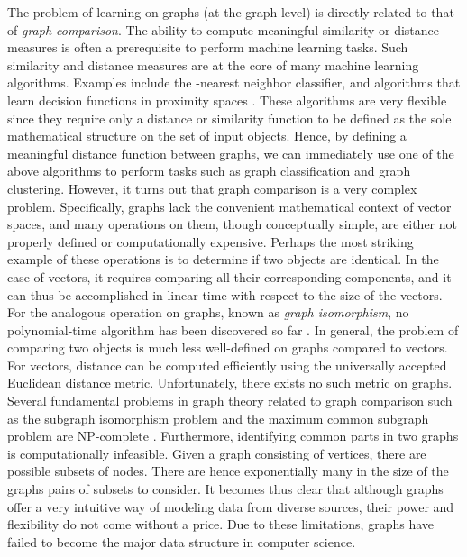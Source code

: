 \documentclass[twoside,11pt]{article}
\begin{document}
The problem of learning on graphs (at the graph level) is directly related to that of \textit{graph comparison}.
The ability to compute meaningful similarity or distance measures is often a prerequisite to perform machine learning tasks.
Such similarity and distance measures are at the core of many machine learning algorithms.
Examples include the -nearest neighbor classifier, and algorithms that learn decision functions in proximity spaces \cite{graepel1999classification}.
These algorithms are very flexible since they require only a distance or similarity function to be defined as the sole mathematical structure on the set of input objects.
Hence, by defining a meaningful distance function  between graphs, we can immediately use one of the above algorithms to perform tasks such as graph classification and graph clustering.
However, it turns out that graph comparison is a very complex problem.
Specifically, graphs lack the convenient mathematical context of vector spaces, and many operations on them, though conceptually simple, are either not properly defined or computationally expensive.
Perhaps the most striking example of these operations is to determine if two objects are identical.
In the case of vectors, it requires comparing all their corresponding components, and it can thus be accomplished in linear time with respect to the size of the vectors.
For the analogous operation on graphs, known as \textit{graph isomorphism}, no polynomial-time algorithm has been discovered so far \cite{garey1979computers}.
In general, the problem of comparing two objects is much less well-defined on graphs compared to vectors.
For vectors, distance can be computed efficiently using the universally accepted Euclidean distance metric.
Unfortunately, there exists no such metric on graphs.
Several fundamental problems in graph theory related to graph comparison such as the subgraph isomorphism problem and the maximum common subgraph problem are NP-complete \cite{garey1979computers}.
Furthermore, identifying common parts in two graphs is computationally infeasible.
Given a graph consisting of  vertices, there are  possible subsets of nodes.
There are hence exponentially many in the size of the graphs pairs of subsets to consider.
It becomes thus clear that although graphs offer a very intuitive way of modeling data from diverse sources, their power and flexibility do not come without a price.
Due to these limitations, graphs have failed to become the major data structure in computer science.
\end{document}
